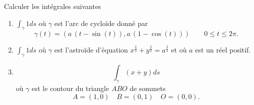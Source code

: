 
\begin{exercice}\label{exoVariete0010}

Calculer les intégrales suivantes
\begin{enumerate}
\item $\int_\gamma 1ds$ où $\gamma$ est l'arc de cycloïde donné par
  \begin{equation*}
    \gamma(t) = \left(a\,(t-\sin(t)),a\,(1 - \cos(t))\right) %
    \qquad 0 \leq t \leq 2\pi.
  \end{equation*}

\item
    $\int_\gamma 1ds$
  où $\gamma$ est l'astroïde d'équation $x^{\frac23} + y^{\frac23} = a^{\frac23}$ et où $a$ est un réel positif.

\item
  \begin{equation}
    \int_\gamma (x+y)d s
  \end{equation}
  où $\gamma$ est le contour du triangle $ABO$ de sommets
  \begin{equation*}
    A = (1,0)\quad B = (0,1) \quad O = (0,0).
  \end{equation*}
\end{enumerate}

\end{exercice}
